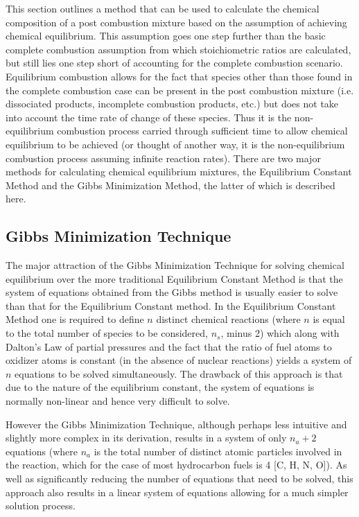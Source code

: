 	This section outlines a method that can be used to calculate the chemical composition
of a post combustion mixture based on the assumption of achieving chemical equilibrium.
This assumption goes one step further than the basic complete combustion assumption from 
which stoichiometric ratios are calculated, but still lies one step short of accounting for
the complete combustion scenario.  Equilibrium combustion allows for the 
fact that species other than those found in the complete combustion case can be present
in the post combustion mixture (i.e. dissociated products, incomplete combustion 
products, etc.) but does not take into account the time rate of change of these species.
Thus it is the non-equilibrium combustion process carried through sufficient time to
allow chemical equilibrium to be achieved (or thought of another way, it is the non-equilibrium
combustion process assuming infinite reaction rates).  There are two major methods for calculating
chemical equilibrium mixtures, the Equilibrium Constant Method and the Gibbs Minimization
Method, the latter of which is described here.

\subsection{Gibbs Minimization Technique}

	The major attraction of the Gibbs Minimization Technique for solving chemical
equilibrium over the more traditional Equilibrium Constant Method is that the system
of equations obtained from the Gibbs method is usually easier to solve than that
for the Equilibrium Constant method.  In the Equilibrium Constant Method one is required
to define $n$ distinct chemical reactions (where $n$ is equal to the total number of 
species to be considered, $n_s$, minus 2) which along with Dalton's Law of partial pressures and 
the fact that the ratio of fuel atoms to oxidizer atoms is constant (in the absence of nuclear
reactions) yields a system of $n$ equations to be solved simultaneously.  The drawback of this 
approach is that due to the nature of the equilibrium constant, the system of equations is normally 
non-linear and hence very difficult to solve.

	However the Gibbs Minimization Technique, although perhaps less
intuitive and slightly more complex in its derivation, results in a system of only $n_a + 2$
equations (where $n_a$ is the total number of distinct atomic particles involved in the reaction,
which for the case of most hydrocarbon fuels is 4 [C, H, N, O]).  As well
as significantly reducing the number of equations that need to be solved, this approach also
results in a linear system of equations allowing for a much simpler solution process.

